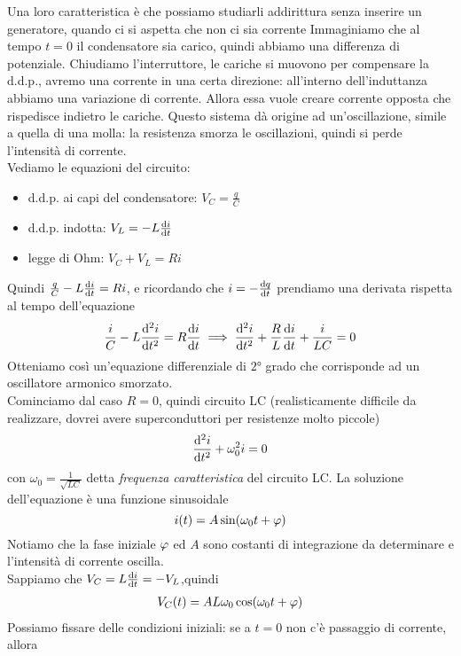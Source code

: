 Una loro caratteristica è che possiamo studiarli addirittura senza inserire un generatore, quando ci si aspetta che non ci sia corrente
Immaginiamo che al tempo $t=0$ il condensatore sia carico, quindi abbiamo una differenza di potenziale. Chiudiamo l'interruttore, le cariche si muovono per compensare la d.d.p., avremo una corrente in una certa direzione: all'interno dell'induttanza abbiamo una variazione di corrente. Allora essa vuole creare corrente opposta che rispedisce indietro le cariche. Questo sistema dà origine ad un'oscillazione, simile a quella di una molla: la resistenza smorza le oscillazioni, quindi si perde l'intensità di corrente.\\
Vediamo le equazioni del circuito:
\begin{itemize}
	\item d.d.p. ai capi del condensatore: $V_C=\frac{q}{C}$
	\item d.d.p. indotta: $V_L=-L\dv{i}{t}$
	\item legge di Ohm: $V_C+V_L=Ri$
\end{itemize}
Quindi $\frac{q}{C}-L\dv{i}{t}=Ri$, e ricordando che $i=-\dv{q}{t}$ prendiamo una derivata rispetta al tempo dell'equazione
\begin{gather*}
\frac{i}{C} -L\dv[2]{i}{t}=R\dv{i}{t} \implies
\dv[2]{i}{t}+\frac{R}{L}\dv{i}{t} +\frac{i}{LC}=0
\end{gather*}
Otteniamo così un'equazione differenziale di $2°$ grado che corrisponde ad un oscillatore armonico smorzato.\\
Cominciamo dal caso $R=0$, quindi circuito LC (realisticamente difficile da realizzare, dovrei avere superconduttori per resistenze molto piccole)
\begin{equation*}
	\dv[2]{i}{t} +\omega_0^2 i=0
\end{equation*}
con $\omega_0=\frac{1}{\sqrt{LC}}$ detta \textit{frequenza caratteristica} del circuito LC. La soluzione dell'equazione è una funzione sinusoidale 
\begin{equation*}
	i(t)=A\sin(\omega_0 t+\oldphi)
\end{equation*}
Notiamo che la fase iniziale $\oldphi$ ed $A$ sono costanti di integrazione da determinare e l'intensità di corrente oscilla.\\
Sappiamo che $V_C=L\dv{i}{t}=-V_L$,quindi 
\begin{gather*}
	V_C(t)=AL\omega_0\cos(\omega_0 t+\oldphi)
\end{gather*}
Possiamo fissare delle condizioni iniziali: se a $t=0$ non c'è passaggio di corrente, allora 
